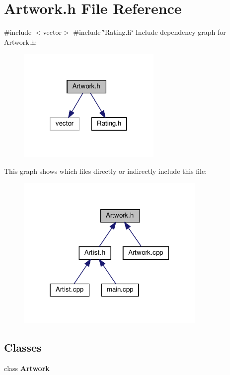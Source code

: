 \section{Artwork.\+h File Reference}
\label{_artwork_8h}
{\ttfamily \#include $<$vector$>$}\newline
{\ttfamily \#include \char`\"{}Rating.\+h\char`\"{}}\newline
Include dependency graph for Artwork.\+h\+:\nopagebreak
\begin{figure}[H]
\begin{center}
\leavevmode
\includegraphics[width=196pt]{_artwork_8h__incl}
\end{center}
\end{figure}
This graph shows which files directly or indirectly include this file\+:\nopagebreak
\begin{figure}[H]
\begin{center}
\leavevmode
\includegraphics[width=259pt]{_artwork_8h__dep__incl}
\end{center}
\end{figure}
\subsection*{Classes}
\begin{DoxyCompactItemize}
\item 
class \textbf{ Artwork}
\end{DoxyCompactItemize}
